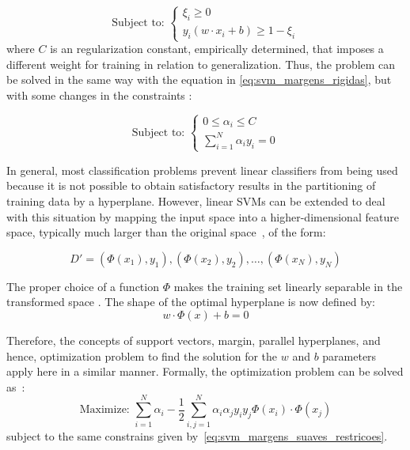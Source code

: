 \begin{equation}
\label{eq:svm_margens_suaves_def_restricoes}
\text{Subject to: }
\begin{cases}
    \xi_i \geq 0\\[1em]
    y_i (w \cdot x_i + b) \geq 1 - \xi_i
\end{cases}
\end{equation}
\noindent where $C$ is an regularization constant, empirically determined, that imposes a different weight for training in relation to generalization. Thus, the problem can be solved in the same way with the equation in \ref{eq:svm_margens_rigidas}, but with some changes in the constraints \citep{lorena:03}:

\begin{equation}
\label{eq:svm_margens_suaves_restricoes}
\text{Subject to: }
\begin{cases}
    0 \leq \alpha_i \leq C\\[1em]
    \sum_{i=1}^N \alpha_i y_i = 0
\end{cases}
\end{equation}

In general, most classification problems prevent linear classifiers from being used because it is not possible to obtain satisfactory results in the partitioning of training data by a hyperplane. However, linear SVMs can be extended to deal with this situation by mapping the input space into a higher-dimensional feature space, typically much larger than the original space~\citep{duda:12}, of the form:

\begin{equation}
\label{eq:svm_dataset_transformado}
    D' = (\Phi(x_1), y_1), (\Phi(x_2), y_2), \ldots, (\Phi(x_N), y_N)
\end{equation}

The proper choice of a function $\Phi$ makes the training set linearly separable in the transformed space \citep{lorena:03}. The shape of the optimal hyperplane is now defined by:
\begin{equation}
\label{eq:svm_hyperplano_otimo_trasnformado}
w \cdot \Phi(x) + b = 0
\end{equation}

Therefore, the concepts of support vectors, margin, parallel hyperplanes, and hence, optimization problem to find the solution for the $w$ and $b$ parameters apply here in a similar manner. Formally, the optimization problem can be solved as~\citep{lorena:03}:
\begin{equation}
\label{eq:svm_nao_linear}
\text{Maximize: } \sum_{i=1}^N \alpha_i - \frac{1}{2} \sum_{i, j=1}^N \alpha_i \alpha_j y_i y_j \Phi(x_i)\cdot \Phi(x_j)
\end{equation}
\noindent subject to the same constrains given by~\ref{eq:svm_margens_suaves_restricoes}.

